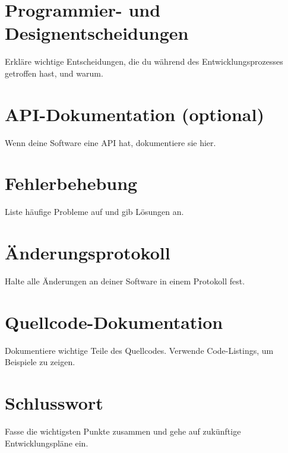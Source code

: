\documentclass[a4paper, 12pt]{article}
\begin{document}
    \section{Programmier- und Designentscheidungen}
    Erkläre wichtige Entscheidungen, die du während des Entwicklungsprozesses getroffen hast, und warum.

    \section{API-Dokumentation (optional)}
    Wenn deine Software eine API hat, dokumentiere sie hier.

    \section{Fehlerbehebung}
    Liste häufige Probleme auf und gib Lösungen an.

    \section{Änderungsprotokoll}
    Halte alle Änderungen an deiner Software in einem Protokoll fest.

    \section{Quellcode-Dokumentation}
    Dokumentiere wichtige Teile des Quellcodes. Verwende Code-Listings, um Beispiele zu zeigen.

    \section{Schlusswort}
    Fasse die wichtigsten Punkte zusammen und gehe auf zukünftige Entwicklungspläne ein.
\end{document}
